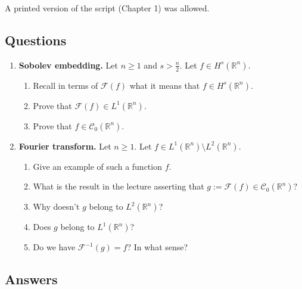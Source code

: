 \documentclass[a4paper, 12pt]{article}
\theoremstyle{plain}
\theoremstyle{definition}
\theoremstyle{remark}
\numberwithin{equation}{section}
\begin{document}
A printed version of the script (Chapter 1) was allowed.

\subsection{Questions}

\begin{enumerate}
\item
{\bf Sobolev embedding.} Let $n \ge 1$ and $s>\frac{n}{2}$. Let $f\in H^s({\mathds{R}}^n)$. 
%
\begin{enumerate}
\item
Recall in terms of ${\mathscr{F}}(f)$ what it means that $f\in H^s({\mathds{R}}^n)$.
\item
Prove that ${\mathscr{F}}(f) \in L^1({\mathds{R}}^n)$.
\item
Prove that $f\in {\mathscr{C}}_0({\mathds{R}}^n)$.
\end{enumerate}
%
\item
{\bf Fourier transform.}
Let $n\ge 1$. Let $f\in L^1({\mathds{R}}^n)\setminus L^2({\mathds{R}}^n)$. 
%
\begin{enumerate}
\item
Give an example of such a function $f$.
\item
What is the result in the lecture asserting that $g:={\mathscr{F}}(f)\in {\mathscr{C}}_0({\mathds{R}}^n)$?
\item
Why doesn't $g$ belong to $L^2({\mathds{R}}^n)$?
\item
Does $g$ belong to $L^1({\mathds{R}}^n)$?
\item
Do we have ${\mathscr{F}}^{-1}(g)=f$? In what sense?
\end{enumerate}
\end{enumerate}

\subsection{Answers}
\end{document}
